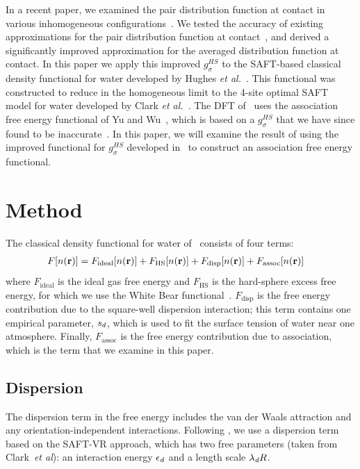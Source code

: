 In a recent paper, we examined the pair distribution function at
contact in various inhomogeneous
configurations~\cite{schulte2012using}.  We tested the accuracy of
existing approximations for the pair distribution function at
contact~\cite{yu2002fmt-dft-inhomogeneous-associating,
  gross2009density}, and derived a significantly improved
approximation for the averaged distribution function at contact.  In
this paper we apply this improved $g_\sigma^{HS}$ to the SAFT-based
classical density functional for water developed by Hughes \emph{et
  al.}~\cite{hughes2013classical}.  This functional was constructed to
reduce in the homogeneous limit to the 4-site optimal SAFT model for
water developed by Clark \emph{et al.}~\cite{clark2006developing}.
The DFT of \hughesetal\ uses the association free energy functional of
Yu and Wu~\cite{yu2002fmt-dft-inhomogeneous-associating}, which is
based on a $g_\sigma^{HS}$ that we have since found to be
inaccurate~\cite{schulte2012using}.  In this paper, we will examine
the result of using the improved functional for $g_\sigma^{HS}$
developed in \hughesetal\ to construct an association free energy
functional.

\section{Method}

The classical density functional for water of \hughesetal\ consists of
four terms:
\begin{align}
  F[n(\textbf{r})] &= F_{\text{ideal}}[n(\textbf{r})] + F_{\text{HS}}[n(\textbf{r})]
  + F_{\text{disp}}[n(\textbf{r})] + F_{\text{assoc}}[n(\textbf{r})]
\end{align}
where $F_{\text{ideal}}$ is the ideal gas free energy and
$F_{\text{HS}}$ is the hard-sphere excess free energy, for which we
use the White Bear functional~\cite{roth2002whitebear}.
$F_{\text{disp}}$ is the free energy contribution due to the
square-well dispersion interaction; this term contains one empirical
parameter, $s_d$, which is used to fit the surface tension of water near one
atmosphere.  Finally, $F_{\text{assoc}}$ is the free energy
contribution due to association, which is the term that we examine in
this paper.

\subsection{Dispersion}
The dispersion term in the free energy includes the van
der Waals attraction and any orientation-independent
interactions. Following \hughesetal, we use a dispersion term based on
the SAFT-VR approach\cite{gil-villegas-1997-SAFT-VR}, which has two
free parameters (taken from Clark~\emph{et
  al}\cite{clark2006developing}): an interaction energy $\epsilon_\textit{d}$
and a length scale $\lambda_\textit{d} R$.

